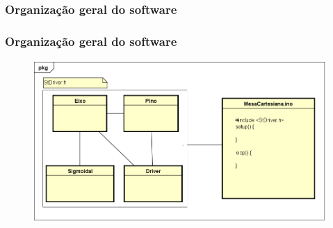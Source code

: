 \subsubsection{Organização geral do software}

\begin{frame}
\frametitle{Organização geral do software}

\begin{figure}
\centering
\includegraphics[scale = 0.4]{figuras/orgsoftware}
\end{figure}

\end{frame}
